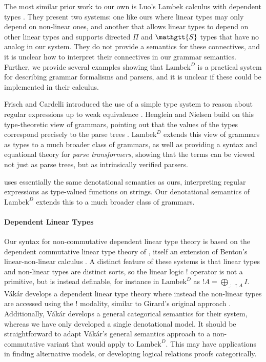\documentclass[acmsmall,nonacm]{acmart}
\renewcommand{\Sigma}{\mathgtt{S}}
\newcommand{\theoryabbv}{$\textrm{Lambek}^D$\xspace}
\newcommand{\ltonl}[1]{~\uparrow #1}
\newcommand{\LinSigTy}[3]{\textstyle\bigoplus_{#1 : #2} #3}
\begin{document}
{The most similar prior work to our own is Luo's Lambek calculus with
dependent types \cite{luo}. They present two systems: one like ours where linear
types may only depend on non-linear ones, and another that
allows linear types to depend on other linear types and supports
directed $\Pi$ and $\Sigma$ types that have no analog in our
system. They do not provide a semantics for these connectives, and it
is unclear how to interpret their connectives in our grammar
semantics. Further, we provide several examples showing that
\theoryabbv is a practical system for describing grammar formalisms
and parsers, and it is unclear if these could be implemented in their calculus.

Frisch and Cardelli introduced the use of a simple type system to reason about
regular expressions up to weak equivalence \cite{frischCardelli}.
Henglein and Nielsen build on this type-theoretic view of grammars, pointing out that the values of the types correspond precisely to the parse trees \cite{henglein_regular_2011}.
\theoryabbv extends this view of grammars as types to a much broader class of grammars, as well as providing a syntax and equational theory for \emph{parse transformers}, showing that the terms can be viewed not just as parse trees, but as intrinsically verified parsers.

\citet{elliottSymbolicAutomaticDifferentiation2021} uses essentially the same denotational semantics as ours, interpreting regular expressions as type-valued functions on strings. Our denotational semantics of \theoryabbv extends this to a much broader class of grammars.

\paragraph{Dependent Linear Types}
Our syntax for non-commutative dependent linear type theory is based on the
dependent commutative linear type theory of
\citet{krishnaswami_integrating_2015}, itself an extension of Benton's
linear-non-linear calculus \cite{benton1994}. A distinct feature of these
systems is that linear types and non-linear types are distinct sorts, so the
linear logic $!$ operator is not a primitive, but is instead definable, for
instance in \theoryabbv as $!A = \LinSigTy{\_}{\ltonl A}{I}$.  V\'ak\'ar
develops a dependent linear type theory where instead the non-linear types are
accessed using the $!$ modality, similar to Girard's original approach
\cite{vakar2015,girard_linear_1987}. Additionally, V\'ak\'ar develops a general
categorical semantics for their system, whereas we have only developed a single
denotational model. It should be straightforward to adapt V\'ak\'ar's general
semantics approach to a non-commutative variant that would apply to
\theoryabbv. This may have applications in finding alternative models, or
developing logical relations proofs categorically.

}
\end{document}
